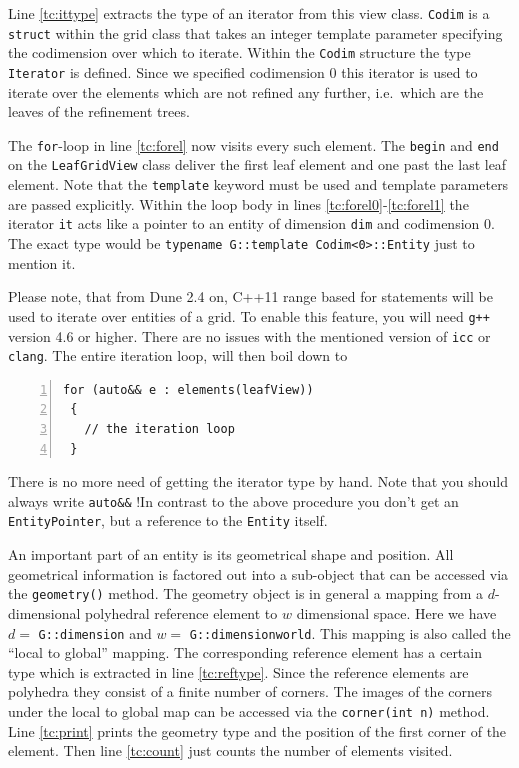 \documentclass[11pt,a4paper,headinclude,footinclude,DIV16,headings=normal]{scrreprt}
\begin{document}
Line \ref{tc:ittype} extracts the type of an iterator from this view
class. \lstinline!Codim! is a \lstinline!struct! within the grid class
that takes an integer template parameter specifying the codimension
over which to iterate. Within the \lstinline!Codim! structure the type
\lstinline!Iterator! is defined. Since we specified codimension 0
this iterator is used to iterate
over the elements which are not refined any further, i.e.~which are
the leaves of the refinement trees.

The \lstinline!for!-loop in line \ref{tc:forel} now visits every such
element. The \lstinline!begin! and \lstinline!end! on the
\lstinline!LeafGridView!
class deliver the first leaf element and one past the last leaf element. Note
that the \lstinline!template! keyword must be used and template parameters are
passed explicitly. Within the loop body in
lines \ref{tc:forel0}-\ref{tc:forel1} the iterator \lstinline!it! acts
like a pointer to an entity of dimension \lstinline!dim! and
codimension 0. The exact type would be
\lstinline!typename G::template Codim<0>::Entity! just to mention it.

Please note, that from Dune 2.4 on, C++11 range based for statements will
be used to iterate over entities of a grid. To enable this feature, you will
need \texttt{g++} version 4.6 or higher. There are no issues with the mentioned
version of \texttt{icc} or \texttt{clang}. The entire iteration loop,
will then boil down to
\begin{lstlisting}[basicstyle=\ttfamily\scriptsize,numbers=left,
numberstyle=\tiny, numbersep=5pt]
 for (auto&& e : elements(leafView))
 {
   // the iteration loop
 }
\end{lstlisting}

There is no more need of getting the iterator type by hand. Note that you
should always write \lstinline!auto&&! !In contrast to the above procedure you don't
get an \lstinline!EntityPointer!, but a reference to the \lstinline!Entity!
itself.

An important part of an entity is its geometrical shape and position.
All geometrical information is factored out into a sub-object that can
be accessed via the \lstinline!geometry()!  method. The geometry
object is in general a mapping from a $d$-dimensional polyhedral
reference element to $w$ dimensional space. Here we have $d=$
\lstinline!G::dimension! and $w=$ \lstinline!G::dimensionworld!. This
mapping is also called the ``local to global'' mapping.  The
corresponding reference element has a certain type which is extracted
in line \ref{tc:reftype}. Since the reference elements are polyhedra
they consist of a finite number of corners. The images of the corners
under the local to global map can be accessed via the
\lstinline!corner(int n)! method. Line \ref{tc:print} prints the geometry type
and the position of the first corner of the element. Then line
\ref{tc:count} just counts the number of elements visited.
\end{document}
